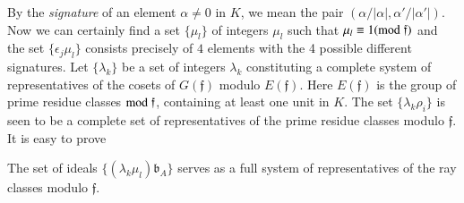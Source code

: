 By the {\em signature} of an element $\alpha\neq 0$ in $K$, we mean
the pair $(\alpha/|\alpha|,\alpha'/|\alpha'|)$. Now we can certainly
find a set $\{\mu_{l}\}$ of integers $\mu_{l}$ such that
$\mu_{l}\equiv 1(\rm{mod} \;\mathfrak{f})$ and the set
$\{\epsilon_{j}\mu_{l}\}$ consists precisely of $4$ elements with the
4 possible different signatures. Let $\{\lambda_{k}\}$ be a set of
integers $\lambda_{k}$ constituting a complete system of
representatives of the cosets of $G(\mathfrak{f})$ modulo
$E(\mathfrak{f})$. Here $E(\mathfrak{f})$ is the group of prime
residue classes $\rm{mod} \; \mathfrak{f}$, containing at least one unit in
$K$. The set $\{\lambda_{k}\rho_{i}\}$ is seen to be a complete set of
representatives of the prime residue classes modulo $\mathfrak{f}$. It
is easy to prove

\begin{proposition}\label{prop15}
The set of ideals $\{(\lambda_{k}\mu_{l})\mathfrak{b}_{A}\}$ serves as
a full system of representatives of the ray classes modulo $\mathfrak{f}$.
\end{proposition}

